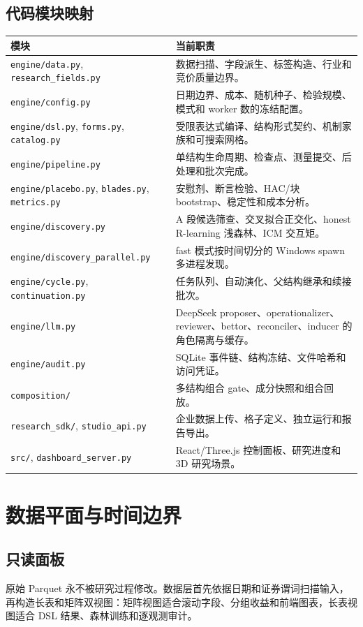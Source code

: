 \documentclass[11pt,a4paper]{article}
\newcommand{\code}[1]{\texttt{#1}}
\begin{document}
\subsection{代码模块映射}
\begin{longtable}{p{}p{}}
\toprule
模块 & 当前职责 \\
\midrule
\code{engine/data.py}, \code{research\_fields.py} & 数据扫描、字段派生、标签构造、行业和竞价质量边界。 \\
\code{engine/config.py} & 日期边界、成本、随机种子、检验规模、模式和 worker 数的冻结配置。 \\
\code{engine/dsl.py}, \code{forms.py}, \code{catalog.py} & 受限表达式编译、结构形式契约、机制家族和可搜索网格。 \\
\code{engine/pipeline.py} & 单结构生命周期、检查点、测量提交、后处理和批次完成。 \\
\code{engine/placebo.py}, \code{blades.py}, \code{metrics.py} & 安慰剂、断言检验、HAC/块 bootstrap、稳定性和成本分析。 \\
\code{engine/discovery.py} & A 段候选筛查、交叉拟合正交化、honest R-learning 浅森林、ICM 交互矩。 \\
\code{engine/discovery\_parallel.py} & fast 模式按时间切分的 Windows spawn 多进程发现。 \\
\code{engine/cycle.py}, \code{continuation.py} & 任务队列、自动演化、父结构继承和续接批次。 \\
\code{engine/llm.py} & DeepSeek proposer、operationalizer、reviewer、bettor、reconciler、inducer 的角色隔离与缓存。 \\
\code{engine/audit.py} & SQLite 事件链、结构冻结、文件哈希和访问凭证。 \\
\code{composition/} & 多结构组合 gate、成分快照和组合回放。 \\
\code{research\_sdk/}, \code{studio\_api.py} & 企业数据上传、格子定义、独立运行和报告导出。 \\
\code{src/}, \code{dashboard\_server.py} & React/Three.js 控制面板、研究进度和 3D 研究场景。 \\
\bottomrule
\end{longtable}

\section{数据平面与时间边界}
\subsection{只读面板}
原始 Parquet 永不被研究过程修改。数据层首先依据日期和证券谓词扫描输入，再构造长表和矩阵双视图：矩阵视图适合滚动字段、分组收益和前端图表，长表视图适合 DSL 结果、森林训练和逐观测审计。
\end{document}
